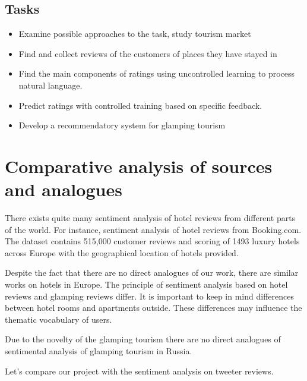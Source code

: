 \documentclass{article}
\begin{document}
\subsection{Tasks}
\setcounter{section}{4}

\begin{itemize}[noitemsep]
	\item Examine possible approaches to the task, study tourism market
	\item Find and collect reviews of the customers of places they have stayed in 
	\item Find the main components of ratings using uncontrolled learning to process natural language.
	\item Predict ratings with controlled training based on specific feedback.
	\item Develop a recommendatory system for glamping tourism
\end{itemize}

\newpage
\section{Comparative analysis of sources and analogues}
There exists quite many sentiment analysis of hotel reviews from different parts of the world\cite{markopoulos2015sentiment}. For instance, sentiment analysis of hotel reviews from Booking.com\cite{elnagar2018hotel}. The dataset contains 515,000 customer reviews and scoring of 1493 luxury hotels across Europe with the geographical location of hotels provided.

Despite the fact that there are no direct analogues of our work, there are similar works on hotels in Europe. The principle of sentiment analysis based on hotel reviews and glamping reviews differ. It is important to keep in mind differences between hotel rooms and apartments outside. These differences may influence the thematic vocabulary of users.

Due to the novelty of the glamping tourism there are no direct analogues of sentimental analysis of glamping tourism in Russia. 

Let’s compare our project with the sentiment analysis on tweeter reviews. \newline
\end{document}
